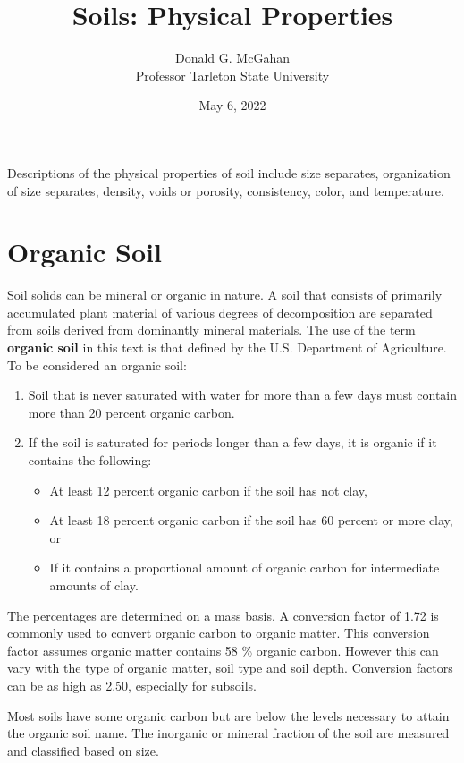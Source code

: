 \documentclass[a5paper]{book}
\title{Soils: Physical Properties}
\author{Donald G. McGahan\\ Professor Tarleton State University}
\date{May 6, 2022}
\begin{document}
\maketitle


Descriptions of the physical properties of soil include size separates, organization of size separates, density, voids or porosity, consistency, color, and temperature.
    
\section{Organic Soil}
\label{organic_soil}
    
Soil solids can be mineral or organic in nature. A soil that consists of primarily accumulated plant material of various degrees of decomposition are separated from soils derived from dominantly mineral materials. The use of the term \textbf{organic soil} in this text is that defined by the U.S. Department of Agriculture. To be considered an organic soil:
    
\begin{enumerate}
    \item Soil that is never saturated with water for more than a few days must contain more than 20 percent organic carbon.
    \item If the soil is saturated for periods longer than a few days, it is organic if it contains the following:
    \begin{itemize}
        \item At least 12 percent organic carbon if the soil has not clay,
        \item At least 18 percent organic carbon if the soil has 60 percent or more clay, or
        \item If it contains a proportional amount of organic carbon for intermediate amounts of clay.
    \end{itemize}
\end{enumerate}
    
The percentages are determined on a mass basis. A conversion factor of 1.72 is commonly used to convert organic carbon to organic matter. This conversion factor assumes organic matter contains 58 \% organic carbon. However this can vary with the type of organic matter, soil type and soil depth. Conversion factors can be as high as 2.50, especially for subsoils.
    
Most soils have some organic carbon but are below the levels necessary to attain the organic soil name. The inorganic or mineral fraction of the soil are measured and classified based on size.
    
\end{document}
